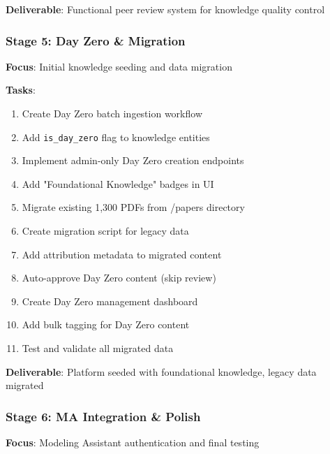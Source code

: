\documentclass[12pt,a4paper]{article}
\begin{document}
\textbf{Deliverable}: Functional peer review system for knowledge quality control

\subsubsection{Stage 5: Day Zero \& Migration}
\textbf{Focus}: Initial knowledge seeding and data migration

\textbf{Tasks}:
\begin{enumerate}
    \item Create Day Zero batch ingestion workflow
    \item Add \texttt{is\_day\_zero} flag to knowledge entities
    \item Implement admin-only Day Zero creation endpoints
    \item Add "Foundational Knowledge" badges in UI
    \item Migrate existing 1,300 PDFs from /papers directory
    \item Create migration script for legacy data
    \item Add attribution metadata to migrated content
    \item Auto-approve Day Zero content (skip review)
    \item Create Day Zero management dashboard
    \item Add bulk tagging for Day Zero content
    \item Test and validate all migrated data
\end{enumerate}

\textbf{Deliverable}: Platform seeded with foundational knowledge, legacy data migrated

\subsubsection{Stage 6: MA Integration \& Polish}
\textbf{Focus}: Modeling Assistant authentication and final testing
\end{document}
